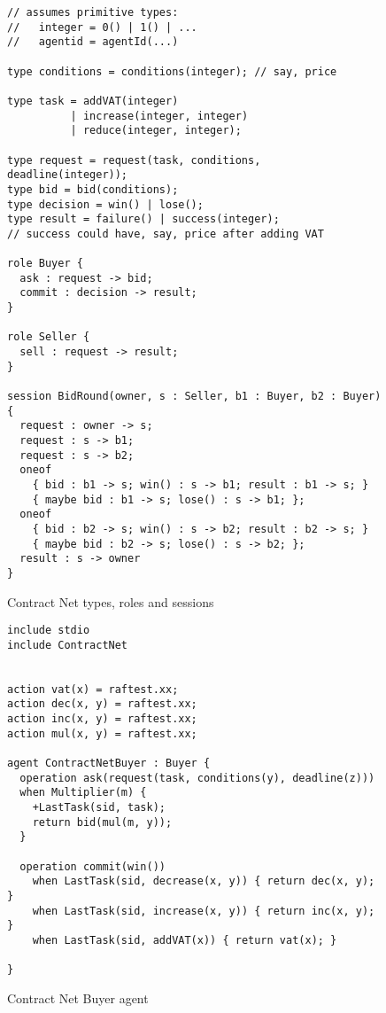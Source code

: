 \documentclass[a4paper,12pt,oneside,fleqn]{book} %
\begin{document}
\begin{figure}\footnotesize %
\begin{verbatim}
// assumes primitive types:
//   integer = 0() | 1() | ...
//   agentid = agentId(...)

type conditions = conditions(integer); // say, price

type task = addVAT(integer)
          | increase(integer, integer)
          | reduce(integer, integer);

type request = request(task, conditions, deadline(integer));
type bid = bid(conditions);
type decision = win() | lose();
type result = failure() | success(integer);
// success could have, say, price after adding VAT

role Buyer {
  ask : request -> bid;
  commit : decision -> result;
}

role Seller {
  sell : request -> result;
}

session BidRound(owner, s : Seller, b1 : Buyer, b2 : Buyer) {
  request : owner -> s;
  request : s -> b1;
  request : s -> b2;
  oneof
    { bid : b1 -> s; win() : s -> b1; result : b1 -> s; }
    { maybe bid : b1 -> s; lose() : s -> b1; };
  oneof
    { bid : b2 -> s; win() : s -> b2; result : b2 -> s; }
    { maybe bid : b2 -> s; lose() : s -> b2; };
  result : s -> owner
}
\end{verbatim}
\caption{Contract Net types, roles and sessions}
\label{fig:contract-roles}
\end{figure} %

\begin{figure}\footnotesize %
\begin{verbatim}
include stdio
include ContractNet

              
action vat(x) = raftest.xx;
action dec(x, y) = raftest.xx;
action inc(x, y) = raftest.xx;
action mul(x, y) = raftest.xx;

agent ContractNetBuyer : Buyer {
  operation ask(request(task, conditions(y), deadline(z)))
  when Multiplier(m) {
    +LastTask(sid, task);
    return bid(mul(m, y));
  }
  
  operation commit(win()) 
    when LastTask(sid, decrease(x, y)) { return dec(x, y); }
    when LastTask(sid, increase(x, y)) { return inc(x, y); }
    when LastTask(sid, addVAT(x)) { return vat(x); }
    
}
\end{verbatim}
\caption{Contract Net Buyer agent}
\label{fig:contract-buyer}
\end{figure} %
\end{document}
